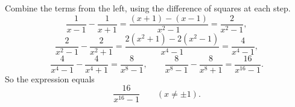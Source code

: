 Combine the terms from the left, using the difference of squares at each step.
\[
\dfrac{1}{x-1}-\dfrac{1}{x+1}=\dfrac{(x+1)-(x-1)}{x^2-1}=\dfrac{2}{x^2-1},
\]
\[
\dfrac{2}{x^2-1}-\dfrac{2}{x^2+1}=\dfrac{2\left(x^2+1\right)-2\left(x^2-1\right)}{x^4-1}=\dfrac{4}{x^4-1},
\]
\[
\dfrac{4}{x^4-1}-\dfrac{4}{x^4+1}=\dfrac{8}{x^8-1},\qquad
\dfrac{8}{x^8-1}-\dfrac{8}{x^8+1}=\dfrac{16}{x^{16}-1}.
\]
So the expression equals
\[
\boxed{\dfrac{16}{x^{16}-1}}\qquad(x\ne\pm1).
\]
